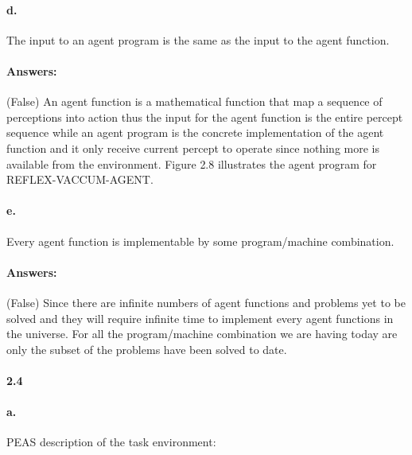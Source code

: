 \documentclass[a4paper]{article}
\begin{document}
\paragraph{d.} The input to an agent program is the same as the input to the agent function.

\paragraph{Answers:}
(False) An agent function is a mathematical function that map a sequence of perceptions into action thus 
the input for the agent function is the entire percept sequence while an agent program is the concrete 
implementation of the agent function and it only receive current percept to operate since nothing more 
is available from the environment. Figure 2.8 illustrates the agent program for REFLEX-VACCUM-AGENT.

\paragraph{e.} Every agent function is implementable by some program/machine combination.

\paragraph{Answers:}
(False) Since there are infinite numbers of agent functions and problems yet to be solved and they will 
require infinite time to implement every agent functions in the universe. For all the program/machine 
combination we are having today are only the subset of the problems have been solved to date. 

\paragraph{2.4}

\paragraph{a.} PEAS description of the task environment:
\end{document}
